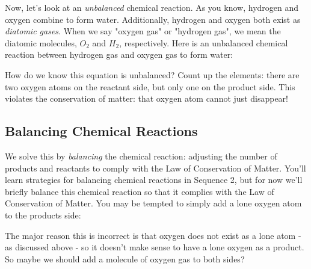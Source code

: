 Now, let's look at an \textit{unbalanced} chemical reaction. As you know, hydrogen
and oxygen combine to form water. Additionally, hydrogen and oxygen both exist as
\textit{diatomic gases}. When we say "oxygen gas" or "hydrogen gas", we mean the 
diatomic molecules, $O_2$ and $H_2$, respectively. Here is an unbalanced chemical 
reaction between hydrogen gas and oxygen gas to form water:

\begin{center}
\end{center}

How do we know this equation is unbalanced? Count up the elements: there are two 
oxygen atoms on the reactant side, but only one on the product side. This violates 
the conservation of matter: that oxygen atom cannot just disappear!

\subsection{Balancing Chemical Reactions}
We solve this by \textit{balancing} the chemical reaction: adjusting the number 
of products and reactants to comply with the Law of Conservation of Matter. You'll
learn strategies for balancing chemical reactions in Sequence 2, but for now we'll
briefly balance this chemical reaction so that it complies with the Law of 
Conservation of Matter. You may be tempted to simply add a lone oxygen atom to 
the products side:

\begin{center}
\end{center}

The major reason this is incorrect is that oxygen does not exist as a lone atom -
as discussed above - so it doesn't make sense to have a lone oxygen as a product. 
So maybe we should add a molecule of oxygen gas to both sides?

\begin{center}
\end{center}

